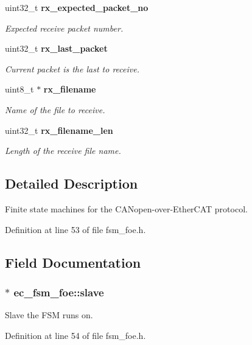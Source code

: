 \begin{DoxyCompactItemize}
uint32\-\_\-t {\bf rx\-\_\-expected\-\_\-packet\-\_\-no}
\begin{DoxyCompactList}\small\item\em Expected receive packet number. \end{DoxyCompactList}\item 
uint32\-\_\-t {\bf rx\-\_\-last\-\_\-packet}
\begin{DoxyCompactList}\small\item\em Current packet is the last to receive. \end{DoxyCompactList}\item 
uint8\-\_\-t $\ast$ {\bf rx\-\_\-filename}
\begin{DoxyCompactList}\small\item\em Name of the file to receive. \end{DoxyCompactList}\item 
uint32\-\_\-t {\bf rx\-\_\-filename\-\_\-len}
\begin{DoxyCompactList}\small\item\em Length of the receive file name. \end{DoxyCompactList}\end{DoxyCompactItemize}


\subsection{Detailed Description}
Finite state machines for the C\-A\-Nopen-\/over-\/\-Ether\-C\-A\-T protocol. 

Definition at line 53 of file fsm\-\_\-foe.\-h.



\subsection{Field Documentation}
\subsubsection[{slave}]{$\ast$ ec\-\_\-fsm\-\_\-foe\-::slave}\label{structec__fsm__foe_ae4d76e0ce8fa63d0dcd8b843933a49af}


Slave the F\-S\-M runs on. 



Definition at line 54 of file fsm\-\_\-foe.\-h.

